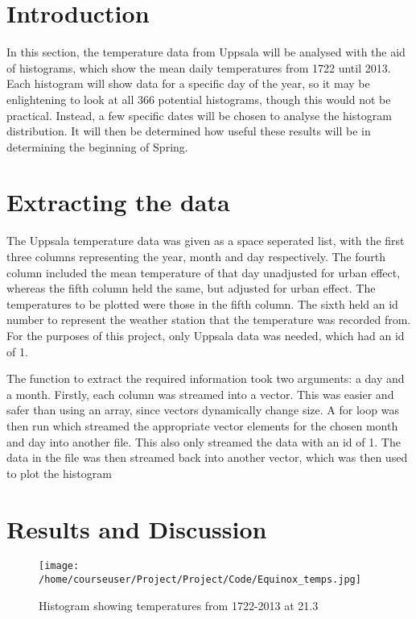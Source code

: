 \documentclass[a4paper,10pt,oneside]{article}
\author{Cameron Robertson}
\date{11/09/17}
\begin{document}
\section{Introduction}
\label{sec:intro}

 In this section, the temperature
data from Uppsala will be analysed with the aid of histograms, which show the mean daily
temperatures from 1722 until 2013. Each histogram will show data for a specific day of the year,
so it may be enlightening to look at all 366 potential histograms, though this would
not be practical. Instead, a few specific dates will be chosen to analyse the histogram
distribution. It will then be determined how useful these results will be in determining the beginning
of Spring.

\section{Extracting the data}
\label{sec:data}

The Uppsala temperature data was given as a space seperated list, with the first three
columns representing the year, month and day respectively. The fourth column included the mean
temperature of that day unadjusted for urban effect, whereas the fifth column held
the same, but adjusted for urban effect. The temperatures to be plotted were those 
in the fifth column. The sixth held an id number to represent the weather station
that the temperature was recorded from. For the purposes of this project, only Uppsala
data was needed, which had an id of 1.

The function to extract the required information took two arguments: a day and a month. Firstly, each column was streamed into a vector. This was
easier and safer than using an array, since vectors dynamically change size. A for loop was then run which streamed the appropriate vector elements for the
chosen month and day into another file. This also only streamed the data with an id of 1. The data in the file was then streamed back into another
vector, which was then used to plot the histogram

\section{Results and Discussion}
\label{sec:res}

\begin{figure} 
  \begin{center}
    \texttt{[image: /home/courseuser/Project/Project/Code/Equinox\_temps.jpg]}
    \caption{Histogram showing temperatures from 1722-2013 at 21.3}
    \label{fig:vern}
  \end{center}
\end{figure}
\end{document}

